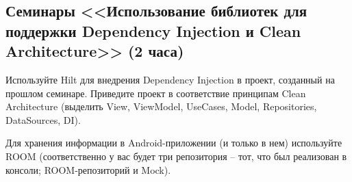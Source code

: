 \subsection{Семинары 
<<Использование библиотек для поддержки Dependency Injection и Clean Architecture>> 
(2 часа)}

Используйте Hilt для внедрения Dependency Injection в проект, созданный 
на прошлом семинаре. Приведите проект в соответствие принципам Clean Architecture
(выделить View, ViewModel, UseCases, Model, Repositories, DataSources, DI).


Для хранения информации в Android-приложении (и только в нем) используйте ROOM (соответственно у вас будет три репозитория -- 
тот, что был реализован в консоли; ROOM-репозиторий и Mock).

